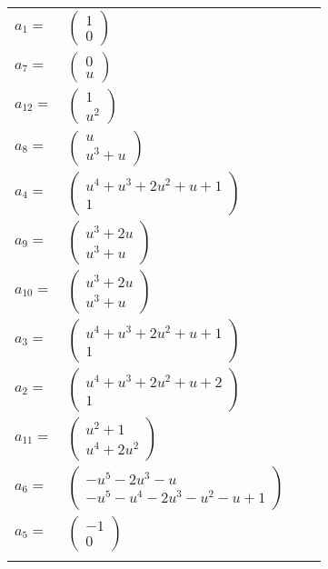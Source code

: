 \documentclass[1p]{elsarticle_modified}
\theoremstyle{definition}
\begin{document}
\begin{tabular}{m{7pt} m{180pt} m{7pt} m{180pt} }
\flushright $a_{1}=$&$\begin{pmatrix}1\\0\end{pmatrix}$ \\
\flushright $a_{7}=$&$\begin{pmatrix}0\\u\end{pmatrix}$ \\
\flushright $a_{12}=$&$\begin{pmatrix}1\\u^2\end{pmatrix}$ \\
\flushright $a_{8}=$&$\begin{pmatrix}u\\u^3+u\end{pmatrix}$ \\
\flushright $a_{4}=$&$\begin{pmatrix}u^4+u^3+2 u^2+u+1\\1\end{pmatrix}$ \\
\flushright $a_{9}=$&$\begin{pmatrix}u^3+2 u\\u^3+u\end{pmatrix}$ \\
\flushright $a_{10}=$&$\begin{pmatrix}u^3+2 u\\u^3+u\end{pmatrix}$ \\
\flushright $a_{3}=$&$\begin{pmatrix}u^4+u^3+2 u^2+u+1\\1\end{pmatrix}$ \\
\flushright $a_{2}=$&$\begin{pmatrix}u^4+u^3+2 u^2+u+2\\1\end{pmatrix}$ \\
\flushright $a_{11}=$&$\begin{pmatrix}u^2+1\\u^4+2 u^2\end{pmatrix}$ \\
\flushright $a_{6}=$&$\begin{pmatrix}- u^5-2 u^3- u\\- u^5- u^4-2 u^3- u^2- u+1\end{pmatrix}$ \\
\flushright $a_{5}=$&$\begin{pmatrix}-1\\0\end{pmatrix}$\\&\end{tabular}
\end{document}
